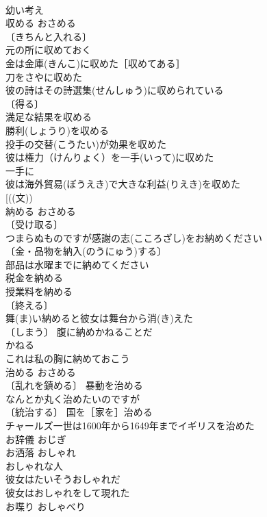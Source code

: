\documentclass[8pt]{extreport}
\begin{document}
\begin{CJK}{UTF8}{min}
\\	幼い考え 
\\	収める	おさめる	
\\	〔きちんと入れる〕
\\	元の所に収めておく 
\\	金は金庫(きんこ)に収めた［収めてある］ 
\\	刀をさやに収めた 
\\	彼の詩はその詩選集(せんしゅう)に収められている 
\\	〔得る〕
\\	満足な結果を収める 
\\	勝利(しょうり)を収める 
\\	投手の交替(こうたい)が効果を収めた 
\\	彼は権力（けんりょく）を一手(いって)に収めた 
\\	一手に 
\\	彼は海外貿易(ぼうえき)で大きな利益(りえき)を収めた 
\\	[((文))
\\	納める	おさめる	
\\	〔受け取る〕 
\\	つまらぬものですが感謝の志(こころざし)をお納めください 
\\	〔金・品物を納入(のうにゅう)する〕 
\\	部品は水曜までに納めてください 
\\	税金を納める 
\\	授業料を納める 
\\	〔終える〕
\\	舞(ま)い納めると彼女は舞台から消(き)えた 
\\	〔しまう〕 腹に納めかねることだ 
\\	かねる　
\\	これは私の胸に納めておこう 
\\	治める	おさめる	
\\	〔乱れを鎮める〕 暴動を治める 
\\	なんとか丸く治めたいのですが 
\\	〔統治する〕 国を［家を］治める 
\\	チャールズ一世は1600年から1649年までイギリスを治めた 
\\	お辞儀	おじぎ	
\\	お洒落	おしゃれ	
\\	おしゃれな人 
\\	彼女はたいそうおしゃれだ 
\\	彼女はおしゃれをして現れた 
\\	お喋り	おしゃべり	

\end{CJK}
\end{document}
